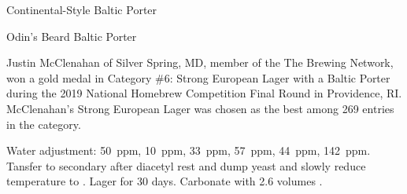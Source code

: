 \begin{recipie}{Continental-Style Baltic Porter}
\begin{ingredientsblock}
\begin{hops}
\end{hops}

\begin{yeasts}
\end{yeasts}

\end{ingredientsblock}

\begin{recipie}{Odin's Beard Baltic Porter}

\begin{aboutblock}
Justin McClenahan of Silver Spring, MD, member of the The Brewing Network, won a
gold medal in Category \#6: Strong European Lager with a Baltic Porter during the
2019 National Homebrew Competition Final Round in Providence, RI. McClenahan's
Strong European Lager was chosen as the best among 269 entries in the category.
\end{aboutblock}


\begin{methodandtiming}
 
\begin{mashsteps}
\end{mashsteps}

\begin{fermentationsteps}
\end{fermentationsteps}

\begin{directions}
Water adjustment:  50~ppm,  10~ppm,  33~ppm,  57~ppm,
 44~ppm,  142~ppm. Tansfer to secondary after diacetyl rest and
dump yeast and slowly reduce temperature to . Lager for 30 days. Carbonate
with 2.6 volumes .
\end{directions}

\end{methodandtiming}


\end{recipie}
\end{recipie}

